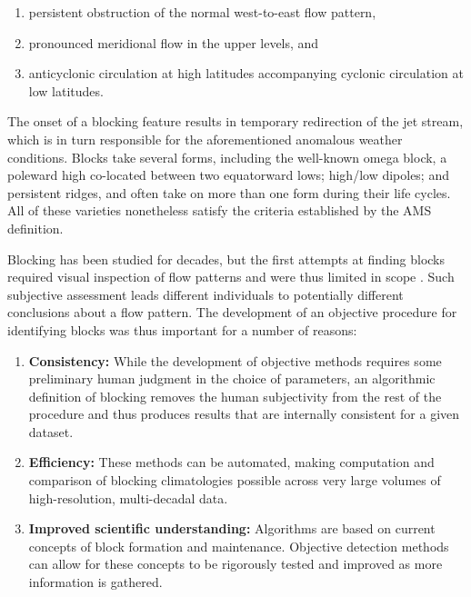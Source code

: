 \documentclass[smallextended]{svjour3}       %
\numberwithin{equation}{section}
\begin{document}
\begin{enumerate}
\item persistent obstruction of the normal west-to-east flow pattern,
\item pronounced meridional flow in the upper levels, and
\item anticyclonic circulation at high latitudes accompanying cyclonic circulation at low latitudes.
\end{enumerate}

The onset of a blocking feature results in temporary redirection of the jet stream, which is in turn responsible for the aforementioned anomalous weather conditions. Blocks take several forms, including the well-known omega block, a poleward high co-located between two equatorward lows; high/low dipoles; and persistent ridges, and often take on more than one form during their life cycles. All of these varieties nonetheless satisfy the criteria established by the AMS definition. 

Blocking has been studied for decades, but the first attempts at finding blocks required visual inspection of flow patterns and were thus limited in scope \citep{rex_blocking_1950}.  Such subjective assessment leads different individuals to potentially different conclusions about a flow pattern. The development of an objective procedure for identifying blocks was thus important for a number of reasons:

\begin{enumerate}
\item \textbf{Consistency:} While the development of objective methods requires some preliminary human judgment in the choice of parameters, an algorithmic definition of blocking removes the human subjectivity from the rest of the procedure and thus produces results that are internally consistent for a given dataset.
\item \textbf{Efficiency:} These methods can be automated, making computation and comparison of blocking climatologies possible across very large volumes of high-resolution, multi-decadal data.
\item \textbf{Improved scientific understanding:} Algorithms are based on current concepts of block formation and maintenance. Objective detection methods can allow for these concepts to be rigorously tested and improved as more information is gathered.
\end{enumerate}
\end{document}
